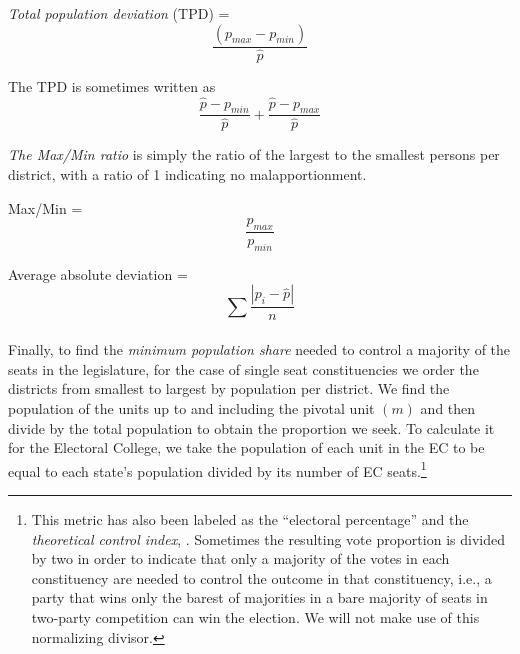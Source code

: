 \textit{Total population deviation} (TPD) =
 \begin{equation}\label{eq:tpd}
 \frac{(p_{max} - p_{min})}{\hat{p}}
 \end{equation}
 
The TPD is sometimes written as
 \begin{equation*}
 \frac{\hat{p} - p_{min}}{\hat{p}} + \frac{\hat{p} - p_{max}}{\hat{p}}
 \end{equation*}

 
\textit{The Max/Min ratio} is simply the ratio of the largest to the smallest persons per district, with a ratio of 1 indicating no malapportionment.

Max/Min =
 \begin{equation}\label{eq:maxmin}
 \frac{p_{max}}{p_{min}} 
 \end{equation}


Average absolute deviation =
 \begin{equation}\label{eq:avgdev}
 \sum_{}{\frac{|p_i - \hat{p}|}{n}}
 \end{equation}

Finally, to find the \textit{minimum population share} needed to control a majority of the seats in the legislature, for the case of single seat constituencies we order the districts from smallest to largest by population per district. We find the population of the units up to and including the pivotal unit $(m)$ and then divide by the total population to obtain the proportion we seek. To calculate it for the Electoral College, we take the population of each unit in the EC to be equal to each state's population divided by its number of EC seats.\footnote{This metric has also been labeled as the ``electoral percentage'' \citep{Dixon1968} and the \textit{theoretical control index}, \citep{GrofmanScarrow1981}. Sometimes the resulting vote proportion is divided by two in order to indicate that only a majority of the votes in each constituency are needed to control the outcome in that constituency, i.e., a party that wins only the barest of majorities in a bare majority of seats in two-party competition can win the election. We will not make use of this normalizing divisor.}


 

